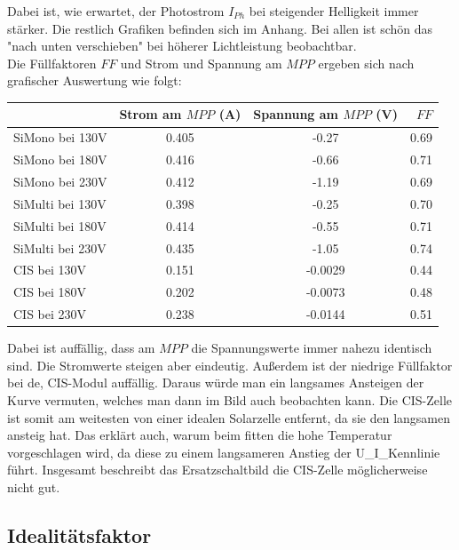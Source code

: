 Dabei ist, wie erwartet, der Photostrom $I_{Ph}$ bei steigender Helligkeit immer stärker. Die restlich Grafiken befinden sich im Anhang. Bei 
allen ist schön das "nach unten verschieben" bei höherer Lichtleistung beobachtbar. \\
Die Füllfaktoren $FF$ und Strom und Spannung am $MPP$ ergeben sich nach grafischer Auswertung wie folgt:\\
\begin{table}[h]
    \centering
    \begin{tabular}{l|c|c|r}
        & Strom am $MPP$ (A) & Spannung am $MPP$ (V) & $FF$ \\
        \toprule
        SiMono bei 130V & 0.405 & -0.27 & 0.69 \\
        SiMono bei 180V & 0.416 &-0.66 & 0.71 \\
        SiMono bei 230V & 0.412 & -1.19 & 0.69\\
        \midrule
        SiMulti bei 130V & 0.398 & -0.25 & 0.70 \\
        SiMulti bei 180V & 0.414 & -0.55 & 0.71 \\
        SiMulti bei 230V & 0.435 & -1.05 & 0.74\\
        \midrule
        CIS bei 130V & 0.151 &  -0.0029 & 0.44 \\
        CIS bei 180V & 0.202 & -0.0073 & 0.48 \\
        CIS bei 230V & 0.238 & -0.0144 & 0.51\\
    \end{tabular}
\end{table}

Dabei ist auffällig, dass am $MPP$ die Spannungswerte immer nahezu identisch sind. Die Stromwerte steigen aber eindeutig. Außerdem ist der 
niedrige Füllfaktor bei de, CIS-Modul auffällig. Daraus würde man ein langsames Ansteigen der Kurve vermuten, welches man dann im Bild auch beobachten kann. 
Die CIS-Zelle ist somit am weitesten von einer idealen Solarzelle entfernt, da sie den langsamen ansteig hat. Das erklärt auch, warum beim fitten die 
hohe Temperatur vorgeschlagen wird, da diese zu einem langsameren Anstieg der U_I_Kennlinie führt. Insgesamt beschreibt das Ersatzschaltbild 
die CIS-Zelle möglicherweise nicht gut.

\clearpage

\subsection{Idealitätsfaktor}

